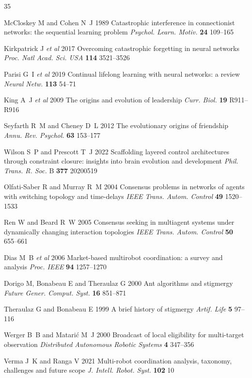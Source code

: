 \documentclass[12pt]{article}
\begin{document}
\begin{thebibliography}{35}

McCloskey M and Cohen N~J 1989 Catastrophic interference in connectionist networks: the sequential learning problem \emph{Psychol. Learn. Motiv.} \textbf{24} 109--165

Kirkpatrick J \emph{et al} 2017 Overcoming catastrophic forgetting in neural networks \emph{Proc. Natl Acad. Sci. USA} \textbf{114} 3521--3526

Parisi G~I \emph{et al} 2019 Continual lifelong learning with neural networks: a review \emph{Neural Netw.} \textbf{113} 54--71

King A~J \emph{et al} 2009 The origins and evolution of leadership \emph{Curr. Biol.} \textbf{19} R911--R916

Seyfarth R~M and Cheney D~L 2012 The evolutionary origins of friendship \emph{Annu. Rev. Psychol.} \textbf{63} 153--177

Wilson S~P and Prescott T~J 2022 Scaffolding layered control architectures through constraint closure: insights into brain evolution and development \emph{Phil. Trans. R. Soc.} B \textbf{377} 20200519

Olfati-Saber R and Murray R~M 2004 Consensus problems in networks of agents with switching topology and time-delays \emph{IEEE Trans. Autom. Control} \textbf{49} 1520--1533

Ren W and Beard R~W 2005 Consensus seeking in multiagent systems under dynamically changing interaction topologies \emph{IEEE Trans. Autom. Control} \textbf{50} 655--661

Dias M~B \emph{et al} 2006 Market-based multirobot coordination: a survey and analysis \emph{Proc. IEEE} \textbf{94} 1257--1270

Dorigo M, Bonabeau E and Theraulaz G 2000 Ant algorithms and stigmergy \emph{Future Gener. Comput. Syst.} \textbf{16} 851--871

Theraulaz G and Bonabeau E 1999 A brief history of stigmergy \emph{Artif. Life} \textbf{5} 97--116

Werger B~B and Matari\'{c} M~J 2000 Broadcast of local eligibility for multi-target observation \emph{Distributed Autonomous Robotic Systems} \textbf{4} 347--356

Verma J~K and Ranga V 2021 Multi-robot coordination analysis, taxonomy, challenges and future scope \emph{J. Intell. Robot. Syst.} \textbf{102} 10


\end{thebibliography}
\end{document}
